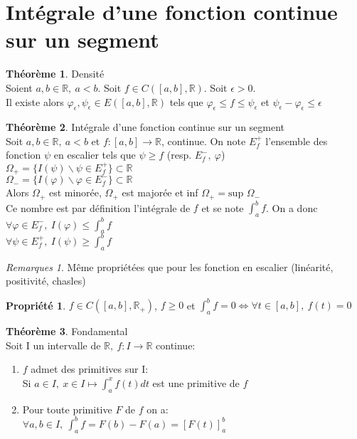 \documentclass[fleqn]{article}
\theoremstyle{definition} \newtheorem*{defi}{D\'efinition}
\theoremstyle{definition} \newtheorem*{theo}{Th\'eor\`eme}
\theoremstyle{remark} \newtheorem*{rqs}{Remarques}
\theoremstyle{definition} \newtheorem*{prop}{Propri\'et\'e}
\begin{document}
\section{Int\'egrale d'une fonction continue sur un segment}
\begin{theo} Densit\'e \\
	Soient $a,b \in \mathbb{R},\ a < b$. Soit $f \in C([a,b], \mathbb{R})$. Soit $\epsilon > 0$. \\
	Il existe alors $\varphi_{\epsilon}, \psi_{\epsilon} \in E([a,b], \mathbb{R})$ tels que $\varphi_{\epsilon} \leq f \leq \psi_{\epsilon}$
	et $\psi_{\epsilon} - \varphi_{\epsilon} \leq \epsilon$
\end{theo}

\begin{theo} Int\'egrale d'une fonction continue sur un segment \\
	Soit $a,b \in \mathbb{R},\ a<b$ et $f:[a,b] \rightarrow \mathbb{R}$, continue. On note $E_f^+$ l'ensemble des fonction $\psi$ en escalier
	tels que $\psi \geq f$ (resp. $E_f^-,\ \varphi$) \\
	$\Omega_+ = \{I(\psi) \backslash \psi \in E_f^+\} \subset \mathbb{R}$ \\
	$\Omega_- = \{I(\varphi) \backslash \varphi \in E_f^-\} \subset \mathbb{R}$ \\
	Alors $\Omega_+$ est minor\'ee, $\Omega_+$ est major\'ee et inf $\Omega_+ = \text{sup }\Omega_-$ \\
	Ce nombre est par d\'efinition l'int\'egrale de $f$ et se note $\int_a^b f$. On a donc\\
	$\forall \varphi \in E_f^-,\ I(\varphi) \leq \int_a^b f$\\
	$\forall \psi \in E_f^+,\ I(\psi) \geq \int_a^b f$
\end{theo}

\begin{rqs} M\^eme propri\'et\'ees que pour les fonction en escalier (lin\'earit\'e, positivit\'e, chasles)
\end{rqs}

\begin{prop} $f \in C([a,b], \mathbb{R}_+)$, $f \geq 0$ et $\int_a^b f = 0 \Leftrightarrow \forall t \in [a,b],\ f(t) = 0$
\end{prop}

\begin{theo} Fondamental \\
	Soit I un intervalle de $\mathbb{R},\ f:I\rightarrow \mathbb{R}$ continue:
	\begin{enumerate}
		\item $f$ admet des primitives sur I: \\
			Si $a \in I,\ x \in I \mapsto \int_a^x f(t)dt$ est une primitive de $f$
		\item Pour toute primitive $F$ de $f$ on a: \\
			$\forall a,b \in I,\ \int_a^b f = F(b) - F(a) = [F(t)]_a^b$
	\end{enumerate}
\end{theo}
\end{document}

